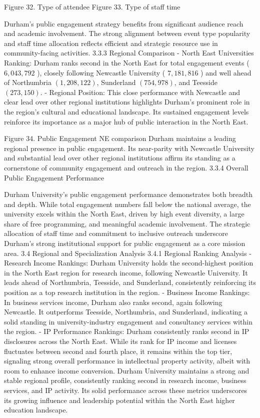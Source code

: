 Figure 32. Type of attendee 
Figure 33. Type of staff time

Durham's public engagement strategy benefits from significant audience reach and academic involvement. The strong alignment between event type popularity and staff time allocation reflects efficient and strategic resource use in community-facing activities.
3.3.3 Regional Comparison
- North East Universities Ranking: Durham ranks second in the North East for total engagement events ( $6,043,792$ ), closely following Newcastle University ( $7,181,816$ ) and well ahead of Northumbria $(1,208,122)$, Sunderland $(754,978)$, and Teesside $(273,150)$.
- Regional Position: This close performance with Newcastle and clear lead over other regional institutions highlights Durham's prominent role in the region's cultural and educational landscape. Its sustained engagement levels reinforce its importance as a major hub of public interaction in the North East.

Figure 34. Public Engagement NE comparison
Durham maintains a leading regional presence in public engagement. Its near-parity with Newcastle University and substantial lead over other regional institutions affirm its standing as a cornerstone of community engagement and outreach in the region.
3.3.4 Overall Public Engagement Performance

Durham University's public engagement performance demonstrates both breadth and depth. While total engagement numbers fall below the national average, the university excels within the North East, driven by high event diversity, a large share of free programming, and meaningful academic involvement. The strategic allocation of staff time and commitment to inclusive outreach underscore Durham's strong institutional support for public engagement as a core mission area.
3.4 Regional and Specialization Analysis
3.4.1 Regional Ranking Analysis
- Research Income Rankings: Durham University holds the second-highest position in the North East region for research income, following Newcastle University. It leads ahead of Northumbria, Teesside, and Sunderland, consistently reinforcing its position as a top research institution in the region.
- Business Income Rankings: In business services income, Durham also ranks second, again following Newcastle. It outperforms Teesside, Northumbria, and Sunderland, indicating a solid standing in university-industry engagement and consultancy services within the region.
- IP Performance Rankings: Durham consistently ranks second in IP disclosures across the North East. While its rank for IP income and licenses fluctuates between second and fourth place, it remains within the top tier, signaling strong overall performance in intellectual property activity, albeit with room to enhance income conversion.
Durham University maintains a strong and stable regional profile, consistently ranking second in research income, business services, and IP activity. Its solid performance across these metrics underscores its growing influence and leadership potential within the North East higher education landscape.

